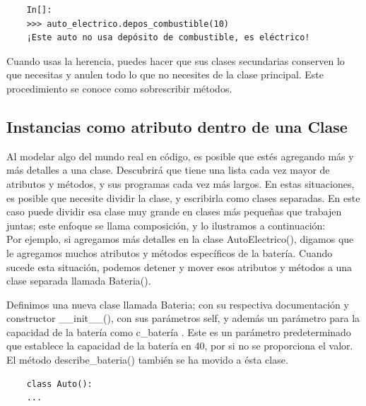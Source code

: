 {\begin{lstlisting}
	In[]:
	>>> auto_electrico.depos_combustible(10)
	¡Este auto no usa depósito de combustible, es eléctrico!
\end{lstlisting}

Cuando usas la herencia, puedes hacer que sus clases secundarias conserven lo que necesitas y anulen todo lo que no necesites de la clase principal. Este procedimiento se conoce como sobrescribir métodos.

\subsection{Instancias como atributo dentro de una Clase} 

Al modelar algo del mundo real en código, es posible que estés agregando más y más detalles a una clase. Descubrirá que tiene una lista cada vez mayor de atributos y métodos, y  sus programas cada vez más largos. En estas situaciones, es posible que necesite dividir la clase, y escribirla como clases separadas.  En este caso puede dividir esa clase muy grande en clases más pequeñas que trabajen juntas; este enfoque se llama composición, y lo ilustramos a continuación:\\


Por ejemplo, si  agregamos más detalles en la clase {\ttfamily AutoElectrico()}, digamos que le agregamos  muchos atributos y métodos específicos de la batería. Cuando  sucede esta situación, podemos detener y mover esos atributos y métodos a una clase separada llamada  {\ttfamily Bateria()}.

Definimos una nueva clase llamada {\ttfamily Bateria}; con su respectiva documentación y constructor {\ttfamily \_\!\!\_init\_\!\!\_()}, con  sus  parámetros {\ttfamily self}, y además un parámetro para la capacidad de la batería como {\ttfamily c\_batería }. Este es un parámetro predeterminado que establece la capacidad de la batería en 40, por si no se proporciona el valor. El método  {\ttfamily describe\_bateria()}  también se ha movido a ésta clase.

\hspace{-2.7cm}{\ttfamily \scriptsize composicion}

\vspace{-0.2cm}
\hspace{-2.3cm}{\ttfamily \scriptsize \_Auto.py}\vspace{-0.86cm}
\begin{lstlisting}
	class Auto():
	...
	

\end{lstlisting}}

